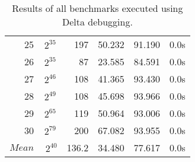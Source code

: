 \begin{table}[b!]
\begin{tabular}{rSrSSS}
    25 & {$2^{35}$} & 197 & 50.232 & 91.190 & 0.0s \\
    26 & {$2^{35}$} & 87 & 23.585 & 84.591 & 0.0s \\
    27 & {$2^{46}$} & 108 & 41.365 & 93.430 & 0.0s \\
    28 & {$2^{49}$} & 108 & 45.698 & 93.966 & 0.0s \\
    29 & {$2^{65}$} & 119 & 50.964 & 93.006 & 0.0s \\
    30 & {$2^{79}$} & 200 & 67.082 & 93.955 & 0.0s \\	\midrule
	{$Mean$} & {$~2^{40}$} & 136.2 & 34.480 & 77.617 & 0.0s \\	\bottomrule
\end{tabular}
\caption{Results of all benchmarks executed using Delta debugging.}
\label{tab:resultsdelta}
\end{table}


